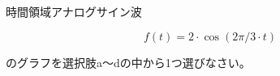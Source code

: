 時間領域アナログサイン波

\[
f(t) = 2 \cdot \cos( 2 \pi/3 \cdot t )
\]

\bigskip
\noindent  のグラフを選択肢a〜dの中から1つ選びなさい。

